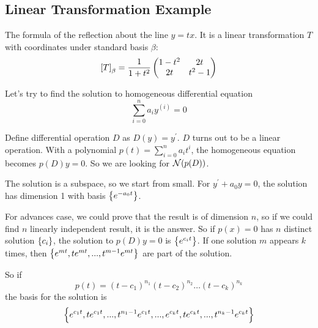 \subsection{Linear Transformation Example}

\begin{example}
    The formula of the reflection about the line $y=tx$. It is a linear transformation $T$ with coordinates under standard basis $\beta$:
    \begin{equation*}
        \coordinate{T}_\beta = \frac{1}{1 + t^2} \begin{pmatrix}
            1-t^2 & 2t \\
            2t & t^2 -1
        \end{pmatrix}
    \end{equation*}
\end{example}


\begin{example}
    Let's try to find the solution to homogeneous differential equation 
    \begin{equation*}
        \sum_{i=0}^n a_i y^{(i)} = 0
    \end{equation*}
    
    Define differential operation $D$ as $D(y) = y^\prime$. $D$ turns out to be a linear operation. With a polynomial $p(t) = \sum_{i=0}^n a_i t^i$, the homogeneous equation becomes $p(D)y = 0$. So we are looking for $\mathcal{N}(p(D))$.
    
    The solution is a subspace, so we start from small. For $y^\prime + a_0 y = 0$, the solution has dimension 1 with basis $\set{e^{-a_0 t}}$.
    
    For advances case, we could prove that the result is of dimension $n$, so if we could find $n$ linearly independent result, it is the answer. So if $p(x) = 0$ has $n$ distinct solution $\set{c_i}$, the solution to $p(D)y = 0$ is $\set{e^{c_i t}}$. If one solution $m$ appears $k$ times, then $\set{e^{mt}, t e^{mt}, ..., t^{m-1} e^{mt}}$ are part of the solution. 
    
    So if 
    \begin{equation*}
        p(t) = (t-c_1)^{n_1} (t-c_2)^{n_2} \hdots (t-c_k)^{n_k} 
    \end{equation*}
    the basis for the solution is 
    \begin{equation*}
        \set{e^{c_1 t}, t e^{c_1 t}, ... , t^{n_1 -1} e^{c_1 t}, ... ,  e^{c_k t}, t e^{c_k t}, ..., t^{n_k -1} e^{c_k t}}
    \end{equation*}
\end{example}


